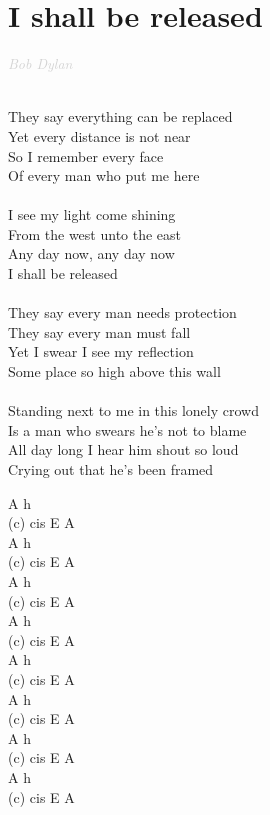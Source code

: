 \documentclass[a5paper, 10pt]{book}
\begin{document}
\section{I shall be released}\textcolor{lightgray}{\textit{Bob Dylan}}\\~\\
\begin{minipage}[t]{0.8\textwidth}
  They say everything can be replaced\\
  Yet every distance is not near\\
  So I remember every face\\
  Of every man who put me here\\
  \\
  \hspace*{5mm}I see my light come shining \\
  \hspace*{5mm}From the west unto the east\\
  \hspace*{5mm}Any day now, any day now\\
  \hspace*{5mm}I shall be released\\
  \\
  They say every man needs protection\\
  They say every man must fall\\
  Yet I swear I see my reflection\\
  Some place so high above this wall\\
  \\
  Standing next to me in this lonely crowd\\
  Is a man who swears he's not to blame\\
  All day long I hear him shout so loud\\
  Crying out that he's been framed\\
\end{minipage}
\begin{minipage}[t]{0.2\textwidth}
  A h\\
  (c) cis E A\\
  A h\\
  (c) cis E A\\

  A h\\
  (c) cis E A\\
  A h\\
  (c) cis E A\\

  A h\\
  (c) cis E A\\
  A h\\
  (c) cis E A\\

  A h\\
  (c) cis E A\\
  A h\\
  (c) cis E A\\

\end{minipage}
\end{document}

